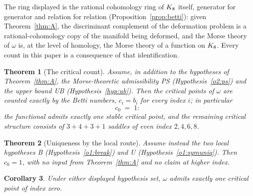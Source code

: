 \documentclass[11pt]{article}
\numberwithin{equation}{section}
\theoremstyle{plain}
\newtheorem{theorem}{Theorem}[section]
\newtheorem{corollary}[theorem]{Corollary}
\theoremstyle{definition}
\theoremstyle{remark}
\begin{document}
The ring displayed is the rational cohomology ring of $K_8$
itself, generator for generator and relation for relation
(Proposition~\ref{prop:betti}): given Theorem~\ref{thm:A}, the
discriminant complement of the deformation problem is a
rational-cohomology copy of the manifold being deformed, and the
Morse theory of $\omega$ is, at the level of homology, the Morse
theory of a function on $K_8$. Every count in this paper is a
consequence of that identification.

\begin{theorem}[The critical count]\label{thm:B}
Assume, in addition to the hypotheses of
Theorem~\textup{\ref{thm:A}}, the Morse-theoretic admissibility PS
\textup{(Hypothesis~\ref{o2:ps})} and the upper bound UB
\textup{(Hypothesis~\ref{hyp:ub})}. Then the critical points of
$\omega$ are counted exactly by the Betti numbers,
$c_{i} = b_{i}$ for every index $i$; in particular
\[
c_{0} \;=\; 1 :
\]
the functional admits exactly one stable critical point, and the
remaining critical structure consists of $3 + 4 + 3 + 1$ saddles
of even index $2, 4, 6, 8$.
\end{theorem}

\begin{theorem}[Uniqueness by the local route]\label{thm:C}
Assume instead the two local hypotheses B
\textup{(Hypothesis~\ref{o1:break})} and U
\textup{(Hypothesis~\ref{o1:symuniq})}. Then $c_{0} = 1$, with no
input from Theorem~\textup{\ref{thm:A}} and no claim at higher
index.
\end{theorem}

\begin{corollary}\label{cor:main}
Under either displayed hypothesis set, $\omega$ admits exactly one
critical point of index zero.
\end{corollary}
\end{document}
